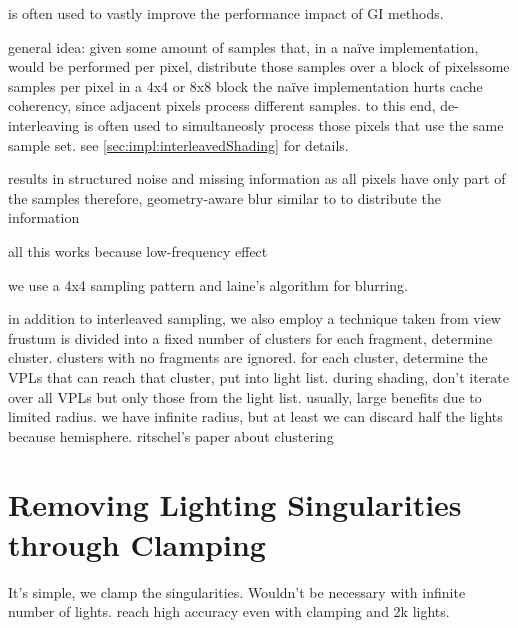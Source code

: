 \citep{Keller:2001:InterleavedSampling} is often used to vastly improve the performance impact of GI methods.

\begin{outline}
\1 general idea: given some amount of samples that, in a naïve implementation, would be performed per pixel, distribute those samples over a block of pixelssome samples per pixel in a 4x4 or 8x8 block
\1 the naïve implementation hurts cache coherency, since adjacent pixels process different samples.
\1 to this end, de-interleaving is often used to simultaneosly process those pixels that use the same sample set. see \ref{sec:impl:interleavedShading} for details.

\1 results in structured noise and missing information as all pixels have only part of the samples
\1 therefore, geometry-aware blur similar to \citet{laine2007incremental} to distribute the information

\1 all this works because low-frequency effect

\1 we use a 4x4 sampling pattern and laine's algorithm for blurring.


\1 in addition to interleaved sampling, we also employ a technique taken from \citet{olsson2012clustered}
\1 view frustum is divided into a fixed number of clusters
\1 for each fragment, determine cluster. clusters with no fragments are ignored.
\1 for each cluster, determine the VPLs that can reach that cluster, put into light list.
\1 during shading, don't iterate over all VPLs but only those from the light list.
\1 usually, large benefits due to limited radius. we have infinite radius, but at least we can discard half the lights because hemisphere.
\1 ritschel's paper about clustering


\end{outline}

\section{Removing Lighting Singularities through Clamping}
\label{sec:clamping}
It's simple, we clamp the singularities. Wouldn't be necessary with infinite number of lights. \citet{hedman2016sequential} reach high accuracy even with clamping and 2k lights.
